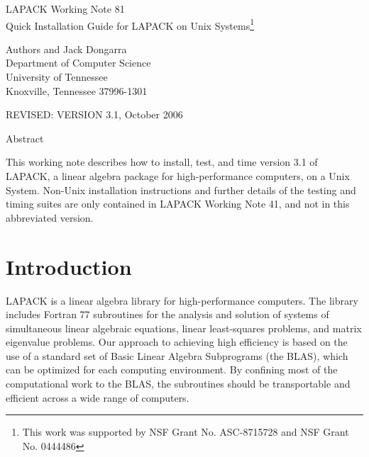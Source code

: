 \documentclass[11pt]{report}
\begin{document}
\begin{center}
  {\Large LAPACK Working Note 81\\
  Quick Installation Guide for LAPACK on Unix Systems\footnote{This work was
 supported by NSF Grant No. ASC-8715728  and NSF Grant No. 0444486}}
\end{center}
\begin{center}
  Authors and Jack Dongarra\\
  Department of Computer Science \\
  University of Tennessee \\
  Knoxville, Tennessee  37996-1301 \\
\end{center}
\begin{center}
  REVISED:  VERSION 3.1, October 2006
\end{center}

\begin{center}
Abstract
\end{center}
This working note describes how to install, test, and time version 3.1
of LAPACK, a linear algebra package for high-performance
computers, on a Unix System.  Non-Unix installation instructions and
further details of the testing and timing suites are only contained in
LAPACK Working Note 41, and not in this abbreviated version.
\newpage

\tableofcontents

\newpage

\section{Introduction}

LAPACK is a linear algebra library for high-performance
computers.
The library includes Fortran 77 subroutines for 
the analysis and solution of systems of simultaneous linear algebraic
equations, linear least-squares problems, and matrix eigenvalue
problems.
Our approach to achieving high efficiency is based on the use of
a standard set of Basic Linear Algebra Subprograms (the BLAS),
which can be optimized for each computing environment.
By confining most of the computational work to the BLAS,
the subroutines should be 
transportable and efficient across a wide range of computers.
\end{document}
